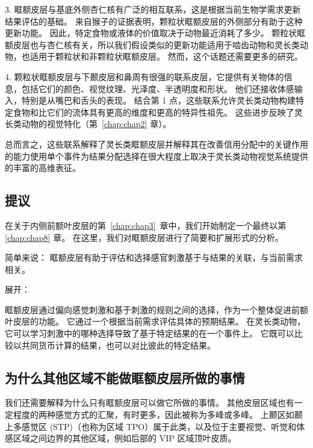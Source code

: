 3. 眶额皮层与基底外侧杏仁核有广泛的相互联系，这是根据当前生物学需求更新结果评估的基础。
来自猴子的证据表明，颗粒状眶额皮层的外侧部分有助于这种更新功能。
因此，特定食物或液体的价值取决于动物最近消耗了多少。
颗粒状眶额皮层也与杏仁核有关，所以我们假设类似的更新功能适用于啮齿动物和灵长类动物，也适用于颗粒状和非颗粒状眶额皮层。
然而，这个话题还需要更多的研究。\par


4. 颗粒状眶额皮层与下颞皮层和鼻周有很强的联系皮层，它提供有关物体的信息，包括它们的颜色、视觉纹理、光泽度、半透明度和形状。
他们还接收体感输入，特别是从嘴巴和舌头的表现。
结合第 1 点，这些联系允许灵长类动物构建特定食物和比它们的流体具有更高的维度和更高的特异性祖先。
这些进步反映了灵长类动物的视觉特化（第~\ref{chap:chap2} 章）。\par


总而言之，这些联系解释了灵长类眶额皮层并解释其在改善信用分配中的关键作用的能力使用单个事件为结果分配选择在很大程度上取决于灵长类动物视觉系统提供的丰富的高维表征。



\subsection{提议}

在关于内侧前额叶皮层的第~\ref{chap:chap3}~章中，我们开始制定一个最终以第 \ref{chap:chap8} 章。
在这里，我们对眶额皮层进行了简要和扩展形式的分析。\par


简单来说：
眶额皮层有助于评估和选择感官刺激基于与结果的关联，与当前需求相关。\par


展开：\par
眶额皮层通过偏向感觉刺激和基于刺激的规则之间的选择，作为一个整体促进前额叶皮层的功能。
它通过一个根据当前需求评估具体的预期结果。
在灵长类动物，它可以学习刺激中的哪种选择导致了基于特定结果的在一个事件上。
它既可以比较以共同货币计算的结果，也可以对比彼此的特定结果。\par



\subsection{为什么其他区域不能做眶额皮层所做的事情}

我们还需要解释为什么只有眶额皮层可以做它所做的事情。 
其他皮层区域也有一定程度的两种感觉方式的汇聚，有时更多，因此被称为多峰或多峰。
上颞区如颞上多感觉区 (STP)（也称为区域 TPO）属于此类\cite{seltzer1994parietal}，以及位于主要视觉、听觉和体感区域之间边界的其他区域，例如后部的 VIP 区域顶叶皮质\cite{schlack2005multisensory}。\par


